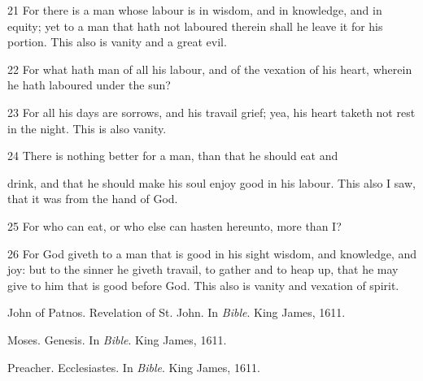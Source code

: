 \documentclass[12pt]{report}
\begin{document}
21 For there is a man whose labour is in wisdom, and in
   knowledge,  
   and in equity; yet to a man that hath not laboured therein shall he
   leave it for his portion. This also is vanity and a great evil.
   
22 For what hath man of all his labour, and of the vexation of
   his
   heart, wherein he hath laboured under the sun?
   
23 For all his days are sorrows, and his travail grief; yea, his
   heart taketh not rest in the night. This is also vanity.
   
24 There is nothing better for a man, than that he should eat and
   
   drink, and that he should make his soul enjoy good in his
   labour. This
   also I saw, that it was from the hand of God.
   
25 For who can eat, or who else can hasten hereunto, more than I?
   
26 For God giveth to a man that is good in his sight wisdom, and
   knowledge, and joy: but to the sinner he giveth travail, to gather
   and
   to heap up, that he may give to him that is good before God. This
   also
   is vanity and vexation of spirit. 



    
%    

\begin{thebibliography}{1}

{John of Patnos}.
\newblock Revelation of {St.} {John}.
\newblock In {\em Bible}. King James, 1611.

Moses.
\newblock Genesis.
\newblock In {\em Bible}. King James, 1611.

Preacher.
\newblock Ecclesiastes.
\newblock In {\em Bible}. King James, 1611.

\end{thebibliography}
\end{document}
